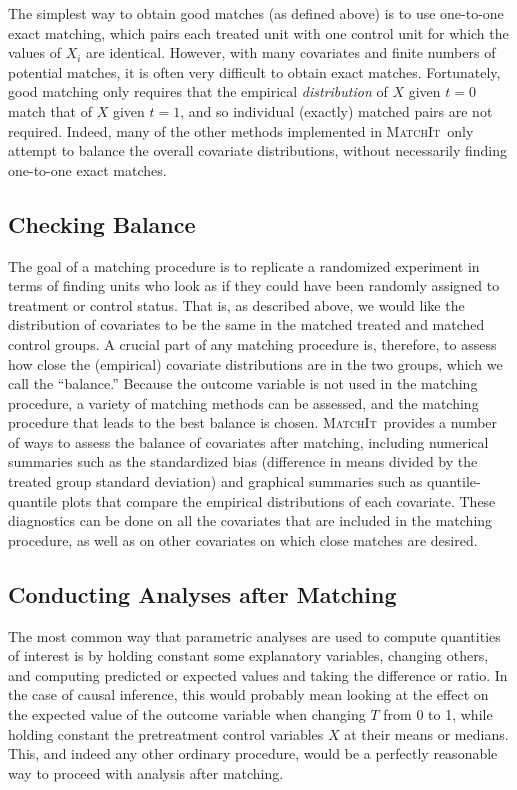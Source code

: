 \documentclass[oneside,letterpaper,titlepage]{article}
\newcommand{\MatchIt}{\textsc{MatchIt}}
\begin{document}
The simplest way to obtain good matches (as defined above) is to use
one-to-one exact matching, which pairs each treated unit with one
control unit for which the values of $X_i$ are identical.  However,
with many covariates and finite numbers of potential matches, it is
often very difficult to obtain exact matches.  Fortunately, good
matching only requires that the empirical \emph{distribution} of $X$
given $t=0$ match that of $X$ given $t=1$, and so individual (exactly)
matched pairs are not required.  Indeed, many of the other methods
implemented in \MatchIt\ only attempt to balance the overall covariate
distributions, without necessarily finding one-to-one exact matches.

\subsection{Checking Balance}
\label{subsec:balance-sum}

The goal of a matching procedure is to replicate a randomized
experiment in terms of finding units who look as if they could have
been randomly assigned to treatment or control status.  That is, as
described above, we would like the distribution of covariates to be
the same in the matched treated and matched control groups. A crucial
part of any matching procedure is, therefore, to assess how close the
(empirical) covariate distributions are in the two groups, which we
call the ``balance.''  Because the outcome variable is not used in the
matching procedure, a variety of matching methods can be assessed, and
the matching procedure that leads to the best balance is chosen.
\MatchIt\ provides a number of ways to assess the balance of
covariates after matching, including numerical summaries such as the
standardized bias (difference in means divided by the treated group
standard deviation) and graphical summaries such as quantile-quantile
plots that compare the empirical distributions of each covariate.
These diagnostics can be done on all the covariates that are included
in the matching procedure, as well as on other covariates on which
close matches are desired.

\subsection{Conducting Analyses after Matching}

The most common way that parametric analyses are used to compute
quantities of interest is by holding constant some explanatory
variables, changing others, and computing predicted or expected values
and taking the difference or ratio.  In the case of causal inference,
this would probably mean looking at the effect on the expected value
of the outcome variable when changing $T$ from 0 to 1, while holding
constant the pretreatment control variables $X$ at their means
or medians.  This, and indeed any other ordinary procedure, would be a
perfectly reasonable way to proceed with analysis after matching.
\end{document}
